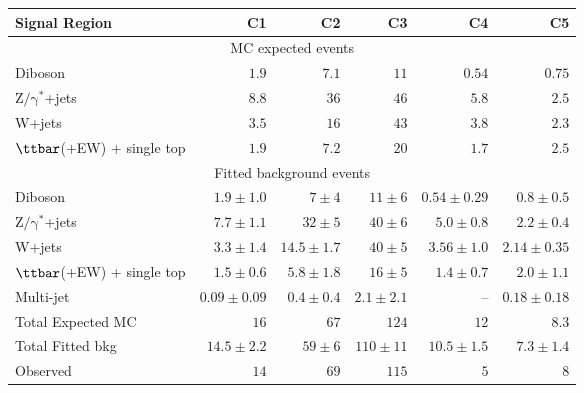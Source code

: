 \begin{table}[tbp]
\begin{center}
\begin{tabular}{|lrrrrr|}
\hline
Signal Region & \textbf{ C1 } & \textbf{ C2 } & \textbf{ C3 } & \textbf{ C4 } & \textbf{ C5 } \\
\hline
\multicolumn{6}{|c|}{MC expected events} \\ \hline
Diboson &  $1.9$               &  $7.1$               &  $11$               &  $0.54$               &  $0.75$               \\
$\mathrm{Z/\gamma^{*}}$+jets &  $8.8$               &  $36$               &  $46$               &  $5.8$               &  $2.5$               \\
W+jets &  $3.5$               &  $16$               &  $43$               &  $3.8$               &  $2.3$               \\
$\ttbar$(+EW) + single top &  $1.9$               &  $7.2$               &  $20$               &  $1.7$               &  $2.5$               \\
\hline
\multicolumn{6}{|c|}{Fitted background events} \\ \hline
Diboson & $1.9 \pm 1.0$ & $7 \pm 4$ & $11 \pm 6$ & $0.54 \pm 0.29$ & $0.8 \pm 0.5$ \\
$\mathrm{Z/\gamma^{*}}$+jets & $7.7 \pm 1.1$ & $32 \pm 5$ & $40 \pm 6$ & $5.0 \pm 0.8$ & $2.2 \pm 0.4$ \\
W+jets & $3.3 \pm 1.4$ & $14.5 \pm 1.7$ & $40 \pm 5$ & $3.56 \pm 1.0$ & $2.14 \pm 0.35$ \\
$\ttbar$(+EW) + single top & $1.5 \pm 0.6$ & $5.8 \pm 1.8$ & $16 \pm 5$ & $1.4 \pm 0.7$ & $2.0 \pm 1.1$ \\
Multi-jet & $0.09 \pm 0.09$ & $0.4 \pm 0.4$ & $2.1 \pm 2.1$ & -- & $0.18 \pm 0.18$ \\
\hline
Total Expected MC &  $16$               &  $67$               &  $124$               &  $12$               &  $8.3$               \\
\hline
Total Fitted bkg & $14.5 \pm 2.2$ & $59 \pm 6$ & $110 \pm 11$ & $10.5 \pm 1.5$ & $7.3 \pm 1.4$ \\
\hline
Observed &  $14$                     &  $69$                     &  $115$                     &  $5$                     &  $8$                     \\
\hline



\end{tabular}
\end{center}
\end{table}
